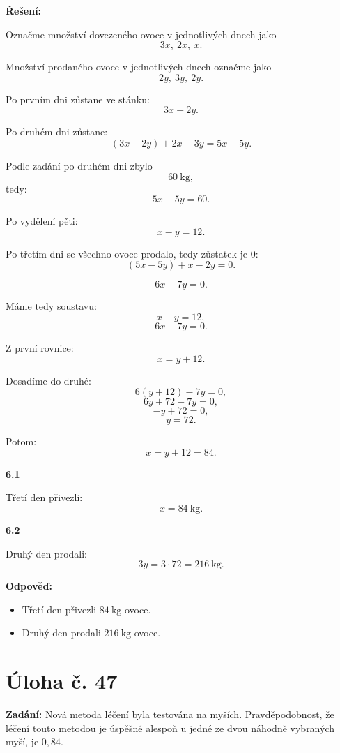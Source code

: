 \documentclass[12pt,a4paper]{article}
\begin{document}
\bigskip

\textbf{Řešení:}

Označme množství dovezeného ovoce v jednotlivých dnech jako
\[
3x,\ 2x,\ x.
\]

Množství prodaného ovoce v jednotlivých dnech označme jako
\[
2y,\ 3y,\ 2y.
\]

\medskip

Po prvním dni zůstane ve stánku:
\[
3x-2y.
\]

Po druhém dni zůstane:
\[
(3x-2y)+2x-3y=5x-5y.
\]

Podle zadání po druhém dni zbylo
\[
60\ \mathrm{kg},
\]
tedy:
\[
5x-5y=60.
\]

Po vydělení pěti:
\[
x-y=12.
\]

\medskip

Po třetím dni se všechno ovoce prodalo, tedy zůstatek je 0:
\[
(5x-5y)+x-2y=0.
\]

\[
6x-7y=0.
\]

\medskip

Máme tedy soustavu:
\[
x-y=12,
\]
\[
6x-7y=0.
\]

Z první rovnice:
\[
x=y+12.
\]

Dosadíme do druhé:
\[
6(y+12)-7y=0,
\]
\[
6y+72-7y=0,
\]
\[
-y+72=0,
\]
\[
y=72.
\]

Potom:
\[
x=y+12=84.
\]

\bigskip

\textbf{6.1}

Třetí den přivezli:
\[
x=84\ \mathrm{kg}.
\]

\bigskip

\textbf{6.2}

Druhý den prodali:
\[
3y=3\cdot 72=216\ \mathrm{kg}.
\]

\bigskip

\textbf{Odpověď:}
\begin{itemize}
    \item[6.1] Třetí den přivezli \(84\ \mathrm{kg}\) ovoce.
    \item[6.2] Druhý den prodali \(216\ \mathrm{kg}\) ovoce.
\end{itemize}



\newpage
\section*{Úloha č. 47}

\textbf{Zadání:}  
Nová metoda léčení byla testována na myších. Pravděpodobnost, že léčení touto metodou je úspěšné alespoň u jedné ze dvou náhodně vybraných myší, je \(0{,}84\).
\end{document}
